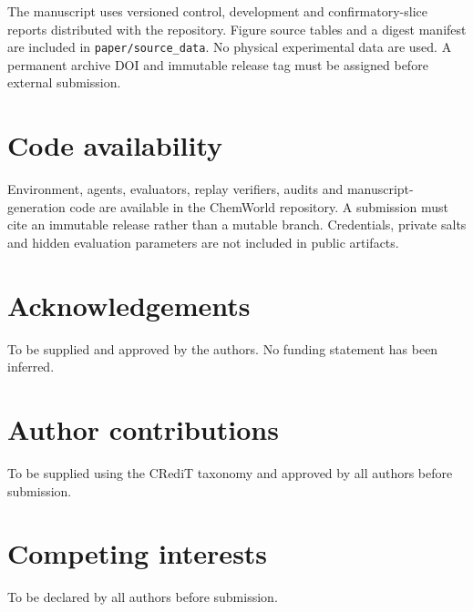 \documentclass[11pt]{article}
\begin{document}
The manuscript uses versioned control, development and confirmatory-slice reports distributed with the repository. Figure source tables and a digest manifest are included in \texttt{paper/source\_data}. No physical experimental data are used. A permanent archive DOI and immutable release tag must be assigned before external submission.

\section*{Code availability}

Environment, agents, evaluators, replay verifiers, audits and manuscript-generation code are available in the ChemWorld repository. A submission must cite an immutable release rather than a mutable branch. Credentials, private salts and hidden evaluation parameters are not included in public artifacts.

\section*{Acknowledgements}

To be supplied and approved by the authors. No funding statement has been inferred.

\section*{Author contributions}

To be supplied using the CRediT taxonomy and approved by all authors before submission.

\section*{Competing interests}

To be declared by all authors before submission.



\end{document}
